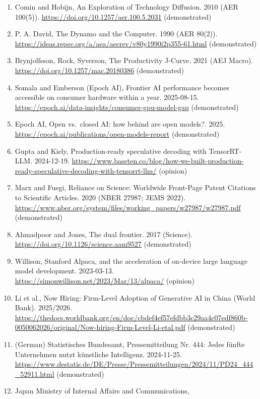 \documentclass[10pt,letterpaper]{article}
\begin{document}
\begin{enumerate}
  (demonstrated)
\item
  Comin and Hobijn, An Exploration of Technology Diffusion. 2010 (AER
  100(5)). \url{https://doi.org/10.1257/aer.100.5.2031} (demonstrated)
\item
  P. A. David, The Dynamo and the Computer. 1990 (AER 80(2)).
  \url{https://ideas.repec.org/a/aea/aecrev/v80y1990i2p355-61.html}
  (demonstrated)
\item
  Brynjolfsson, Rock, Syverson, The Productivity J-Curve. 2021 (AEJ
  Macro). \url{https://doi.org/10.1257/mac.20180386} (demonstrated)
\item
  Somala and Emberson (Epoch AI), Frontier AI performance becomes
  accessible on consumer hardware within a year. 2025-08-15.
  \url{https://epoch.ai/data-insights/consumer-gpu-model-gap}
  (demonstrated)
\item
  Epoch AI, Open vs.~closed AI: how behind are open models?. 2025.
  \url{https://epoch.ai/publications/open-models-report} (demonstrated)
\item
  Gupta and Kiely, Production-ready speculative decoding with
  TensorRT-LLM. 2024-12-19.
  \url{https://www.baseten.co/blog/how-we-built-production-ready-speculative-decoding-with-tensorrt-llm/}
  (opinion)
\item
  Marx and Fuegi, Reliance on Science: Worldwide Front-Page Patent
  Citations to Scientific Articles. 2020 (NBER 27987; JEMS 2022).
  \url{https://www.nber.org/system/files/working_papers/w27987/w27987.pdf}
  (demonstrated)
\item
  Ahmadpoor and Jones, The dual frontier. 2017 (Science).
  \url{https://doi.org/10.1126/science.aam9527} (demonstrated)
\item
  Willison, Stanford Alpaca, and the acceleration of on-device large
  language model development. 2023-03-13.
  \url{https://simonwillison.net/2023/Mar/13/alpaca/} (opinion)
\item
  Li et al., Now Hiring: Firm-Level Adoption of Generative AI in China
  (World Bank). 2025/2026.
  \url{https://thedocs.worldbank.org/en/doc/cbdef4ef57efdbb3c29aa4c07edf860b-0050062026/original/Now-hiring-Firm-Level-Li-etal.pdf}
  (demonstrated)
\item
  (German) Statistisches Bundesamt, Pressemitteilung Nr. 444: Jedes
  fünfte Unternehmen nutzt künstliche Intelligenz. 2024-11-25.
  \url{https://www.destatis.de/DE/Presse/Pressemitteilungen/2024/11/PD24_444_52911.html}
  (demonstrated)
\item
  Japan Ministry of Internal Affairs and Communications,

\end{enumerate}
\end{document}
